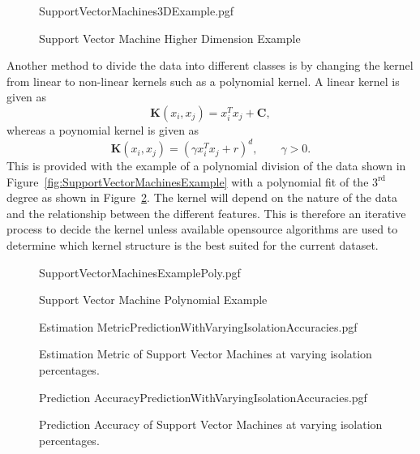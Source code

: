 \begin{figure}[!hbt]
	\centering
	{SupportVectorMachines3DExample.pgf}
	\caption{Support Vector Machine Higher Dimension Example}
	\label{fig:SupportVectorMachines3DExample}
\end{figure}

Another method to divide the data into different classes is by changing the kernel from linear to non-linear kernels such as a polynomial kernel. A linear kernel is given as 
\begin{equation}
\mathbf{K}\left(x_i,x_j \right) = x_i^Tx_j+ \mathbf{C},
\end{equation}
whereas a poynomial kernel is given as
\begin{equation}
\mathbf{K}\left(x_i,x_j \right) = \left(\gamma x_i^Tx_j + r \right)^d, \qquad \gamma > 0.
\end{equation}
This is provided with the example of a polynomial division of the data shown in Figure~\ref{fig:SupportVectorMachinesExample} with a polynomial fit of the $3^{\text{rd}}$ degree as shown in Figure~\ref{fig:SupportVectorMachinesExamplePoly}. The kernel will depend on the nature of the data and the relationship between the different features. This is therefore an iterative process to decide the kernel unless available opensource algorithms are used to determine which kernel structure is the best suited for the current dataset.

\begin{figure}[!hbt]
	\centering
	{SupportVectorMachinesExamplePoly.pgf}
	\caption{Support Vector Machine Polynomial Example}
	\label{fig:SupportVectorMachinesExamplePoly}
\end{figure}

\begin{figure}[!htb]
	\centering
	{Estimation MetricPredictionWithVaryingIsolationAccuracies.pgf}
	
	\caption{Estimation Metric of Support Vector Machines at varying isolation percentages.}
	\label{fig:SVMWithVaryingIsolationEstimation}
\end{figure}

\begin{figure}[!htb]
	\centering
	{Prediction AccuracyPredictionWithVaryingIsolationAccuracies.pgf}
	
	\caption{Prediction Accuracy of Support Vector Machines at varying isolation percentages.}
	\label{fig:SVMWithVaryingIsolationPrediction}
\end{figure}

